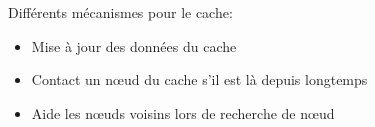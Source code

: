 \documentclass{beamer}
\begin{document}
  \begin{frame}


  \end{frame}

  \begin{frame}
	Différents mécanismes pour le cache:
	\begin{itemize}
		\item Mise à jour des données du cache
		\item Contact un nœud du cache s'il est là depuis longtemps
		\item Aide les nœuds voisins lors de recherche de nœud	
	\end{itemize}
  \end{frame}

 
\end{document}
